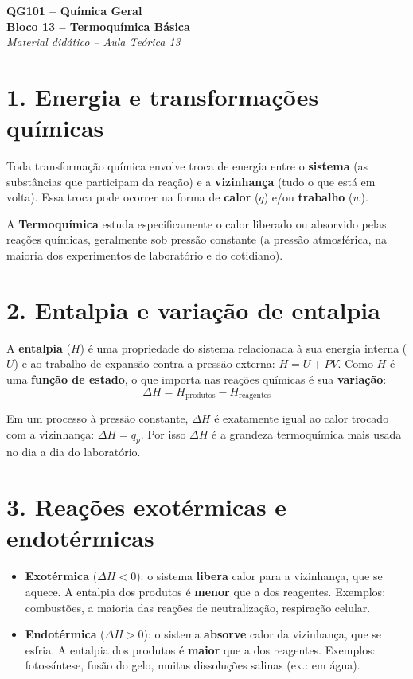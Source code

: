 \documentclass[11pt,a4paper]{article}
\begin{document}
\begin{center}
  {\LARGE\bfseries QG101 -- Química Geral}\\[4pt]
  {\large\bfseries Bloco 13 -- Termoquímica Básica}\\[2pt]
  \textit{Material didático -- Aula Teórica 13}
\end{center}

\bigskip

\section*{1. Energia e transformações químicas}

Toda transformação química envolve troca de energia entre o
\textbf{sistema} (as substâncias que participam da reação) e a
\textbf{vizinhança} (tudo o que está em volta). Essa troca pode ocorrer
na forma de \textbf{calor} ($q$) e/ou \textbf{trabalho} ($w$).

A \textbf{Termoquímica} estuda especificamente o calor liberado ou
absorvido pelas reações químicas, geralmente sob pressão constante (a
pressão atmosférica, na maioria dos experimentos de laboratório e do
cotidiano).

\section*{2. Entalpia e variação de entalpia}

A \textbf{entalpia} ($H$) é uma propriedade do sistema relacionada à sua
energia interna ($U$) e ao trabalho de expansão contra a pressão externa:
$H = U + PV$. Como $H$ é uma \textbf{função de estado}, o que importa nas
reações químicas é sua \textbf{variação}:
$$\Delta H = H_{\text{produtos}} - H_{\text{reagentes}}$$

Em um processo à pressão constante, $\Delta H$ é exatamente igual ao calor
trocado com a vizinhança: $\Delta H = q_p$. Por isso $\Delta H$ é a
grandeza termoquímica mais usada no dia a dia do laboratório.

\section*{3. Reações exotérmicas e endotérmicas}

\begin{itemize}
\item \textbf{Exotérmica} ($\Delta H < 0$): o sistema \textbf{libera}
  calor para a vizinhança, que se aquece. A entalpia dos produtos é
  \textbf{menor} que a dos reagentes. Exemplos: combustões, a maioria das
  reações de neutralização, respiração celular.
\item \textbf{Endotérmica} ($\Delta H > 0$): o sistema \textbf{absorve}
  calor da vizinhança, que se esfria. A entalpia dos produtos é
  \textbf{maior} que a dos reagentes. Exemplos: fotossíntese, fusão do
  gelo, muitas dissoluções salinas (ex.:  em água).
\end{itemize}
\end{document}
